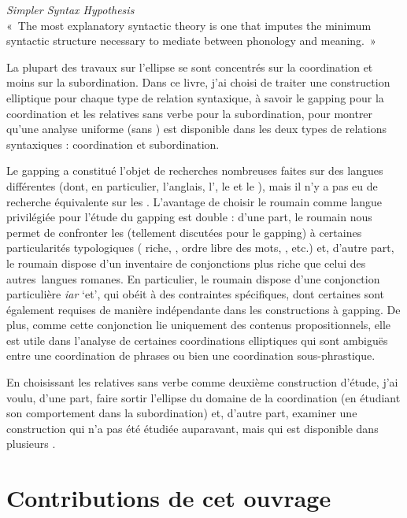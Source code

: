 \ea 
\textit{Simpler Syntax Hypothesis}\\ 
«~The most explanatory syntactic theory is one that imputes the minimum syntactic structure necessary to mediate between phonology and meaning.~»  
\z

 
La plupart des travaux sur l’ellipse se sont concentrés sur la coordination et moins sur la subordination. Dans ce livre, j’ai choisi de traiter une construction elliptique pour chaque type de relation syntaxique, à savoir le gapping pour la coordination et les relatives sans verbe pour la subordination, pour montrer qu’une analyse uniforme (sans ) est disponible dans les deux types de relations syntaxiques : coordination et subordination.



Le gapping a constitué l’objet de recherches nombreuses faites sur des langues différentes (dont, en particulier, l’anglais, l’, le  et le ), mais il n’y a pas eu de recherche équivalente sur les . L’avantage de choisir le roumain comme langue privilégiée pour l’étude du gapping est double : d’une part, le roumain nous permet de confronter les  (tellement discutées pour le gapping) à certaines particularités typologiques ( riche, , ordre libre des mots, , etc.) et, d’autre part, le roumain dispose d’un inventaire de conjonctions plus riche que celui des autres~langues romanes. En particulier, le roumain dispose d’une conjonction particulière \textit{iar} ‘et’, qui obéit à des contraintes spécifiques, dont certaines sont également requises de manière indépendante dans les constructions à gapping. De plus, comme cette conjonction lie uniquement des contenus propositionnels, elle est utile dans l’analyse de certaines coordinations elliptiques qui sont ambiguës entre une coordination de phrases ou bien une coordination sous-phrastique. 



En choisissant les relatives sans verbe comme deuxième construction d’étude, j’ai voulu, d’une part, faire sortir l’ellipse du domaine de la coordination (en étudiant son comportement dans la subordination) et, d’autre part, examiner une construction qui n’a pas été étudiée auparavant, mais qui est disponible dans plusieurs . 



\section{Contributions de cet ouvrage}
\largerpage

